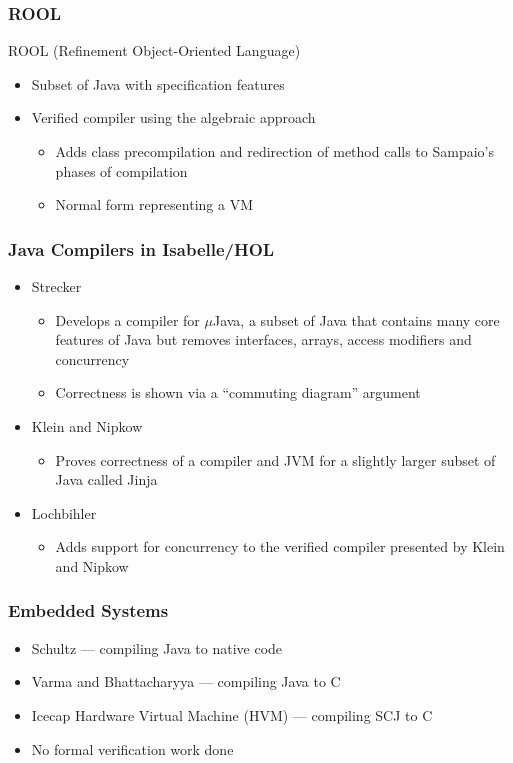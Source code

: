 \documentclass{beamer}
\newcommand{\footmake}[1]{
\ifthenelse{\equal{#1}{}}%
	{}%
	{\footnotetext{#1}}%
}
\newenvironment{slide}[2][fragile,environment=slide]
{\begin{frame}[#1]
	\frametitle{#2}\begin{refsegment}}
{\footmake{\printbibliography[segment=\therefsegment]}\end{refsegment}\end{frame}}
\begin{document}
\begin{slide}{ROOL}
ROOL (Refinement Object-Oriented Language)\cite{cavalcanti2000}
\begin{itemize}
\item Subset of Java with specification features
\item Verified compiler using the algebraic approach\cite{duran2005, duran2010}
  \begin{itemize}
  \item Adds class precompilation and redirection of method calls to
Sampaio’s phases of compilation
  \item Normal form representing a VM
  \end{itemize}
\end{itemize}
\end{slide}

\begin{slide}{Java Compilers in Isabelle/HOL}
  \begin{itemize}
  \item Strecker\cite{strecker2002}
    \begin{itemize}
    \item Develops a compiler for $\mu$Java, a subset of Java that contains many core features of Java but removes interfaces, arrays, access modifiers and concurrency
    \item Correctness is shown via a ``commuting diagram'' argument
    \end{itemize}
  \item Klein and Nipkow\cite{klein2006}
    \begin{itemize}
    \item Proves correctness of a compiler and JVM for a slightly larger subset of Java called Jinja
    \end{itemize}
  \item Lochbihler\cite{lochbihler2010}
    \begin{itemize}
    \item Adds support for concurrency to the verified compiler presented by Klein and Nipkow
    \end{itemize}
  \end{itemize}
\end{slide}

\begin{slide}{Embedded Systems}
  \begin{itemize}
  \item Schultz\cite{schultz2003} --- compiling Java to native code
  \item Varma and Bhattacharyya\cite{varma2004} --- compiling Java to C
  \item Icecap Hardware Virtual Machine (HVM)\cite{sondergaard2012, korsholm2014} --- compiling SCJ to C
  \item No formal verification work done
  \end{itemize}
\end{slide}
\end{document}
